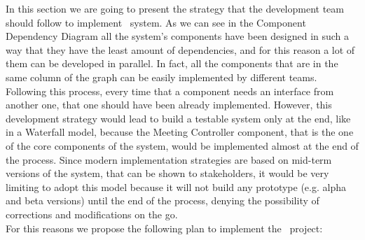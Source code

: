 In this section we are going to present the strategy that the development team should follow to implement \projectname~system. As we can see in the Component Dependency Diagram all the system's components have been designed in such a way that they have the least amount of dependencies, and for this reason a lot of them can be developed in parallel. In fact, all the components that are in the same column of the graph can be easily implemented by different teams. Following this process, every time that a component needs an interface from another one, that one should have been already implemented. However, this development strategy would lead to build a testable system only at the end, like in a Waterfall model, because the Meeting Controller component, that is the one of the core components of the system, would be implemented almost at the end of the process. Since modern implementation strategies are based on mid-term versions of the system, that can be shown to stakeholders, it would be very limiting to adopt this model because it will not build any prototype (e.g. alpha and beta versions) until the end of the process, denying the possibility of corrections and modifications on the go. \\
For this reasons we propose the following plan to implement the \projectname~project:
